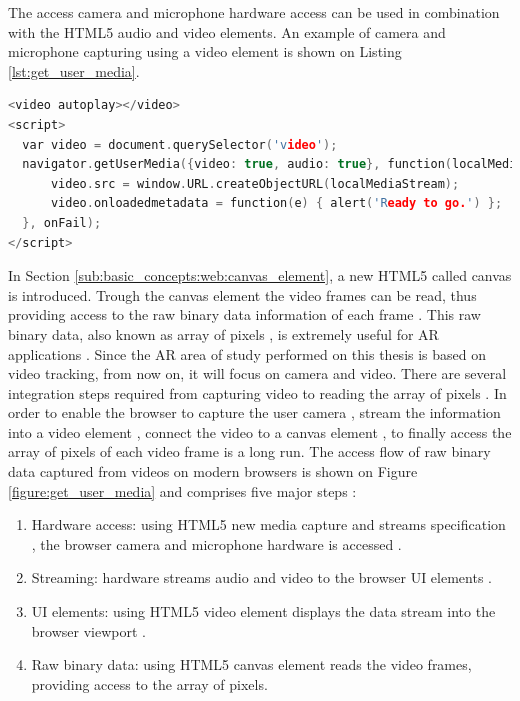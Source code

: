 The access camera and microphone hardware access can be used in combination with the HTML5 \cite{Hickson2013} audio and video elements. An example of camera and microphone capturing using a video element is shown on Listing \ref{lst:get_user_media}.

\begin{lstlisting}[language=C++,label={lst:get_user_media},caption=Capture and display microphone and camera]
<video autoplay></video>
<script>
  var video = document.querySelector('video');
  navigator.getUserMedia({video: true, audio: true}, function(localMediaStream) {
      video.src = window.URL.createObjectURL(localMediaStream);
      video.onloadedmetadata = function(e) { alert('Ready to go.') };
  }, onFail);
</script>
\end{lstlisting}

In Section \ref{sub:basic_concepts:web:canvas_element}, a new HTML5 \cite{Hickson2013} called canvas \cite{Canvas2013} is introduced. Trough the canvas element \cite{Canvas2013} the video frames can be read, thus providing access to the raw binary data information of each frame \cite{Canvas2013} \cite{Hickson2013}. This raw binary data, also known as array of pixels \cite{Gonzalez2007}, is extremely useful for AR applications \cite{Teichrieb2007}. Since the AR area of study performed on this thesis is based on video tracking, from now on, it will focus on camera and video. There are several integration steps required from capturing video to reading the array of pixels \cite{Gonzalez2007}. In order to enable the browser to capture the user camera \cite{MediaCapture2013}, stream the information into a video element \cite{Hickson2013}, connect the video to a canvas element \cite{Canvas2013}, to finally access the array of pixels of each video frame is a long run. The access flow of raw binary data captured from videos on modern browsers is shown on Figure \ref{figure:get_user_media} and comprises five major steps \cite{WebRTC2013} \cite{Rocks2013}:

\begin{enumerate}
  \item  Hardware access: using HTML5 \cite{Hickson2013} new media capture and streams specification \cite{MediaCapture2013}, the browser camera and microphone hardware is accessed \cite{WebRTC2013}.
  \item Streaming: hardware streams audio and video to the browser UI elements \cite{WebRTC2013}.
  \item UI elements: using HTML5 \cite{Hickson2013} video element displays the data stream into the browser viewport \cite{WC2006}.
  \item Raw binary data: using HTML5 \cite{Hickson2013} canvas element \cite{Canvas2013} reads the video frames, providing access to the array of pixels.
\end{enumerate}

